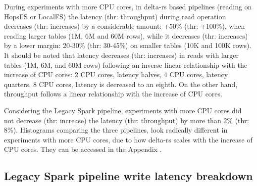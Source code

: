 During experiments with more \gls{CPU} cores, in delta-rs based pipelines (reading on \gls{HopsFS} or \gls{LocalFS}) the latency (thr: throughput) during read operation decreases (thr: increases) by a considerable amount: +50\% (thr: +100\%), when reading larger tables (1M, 6M and 60M rows), while it decreases (thr: increases) by a lower margin: 20-30\% (thr: 30-45\%) on smaller tables (10K and 100K rows). It should be noted that latency decreases (thr: increases) in reads with larger tables (1M, 6M, and 60M rows) following an inverse linear relationship with the increase of \gls{CPU} cores: 2 \gls{CPU} cores, latency halves, 4 \gls{CPU} cores, latency quarters, 8 \gls{CPU} cores, latency is decreased to an eighth. On the other hand, throughput follows a linear relationship with the increase of \gls{CPU} cores.

Considering the Legacy Spark pipeline, experiments with more \gls{CPU} cores did not decrease (thr: increase) the latency (thr: throughput) by more than 2\% (thr: 8\%). Histograms comparing the three pipelines, look radically different in experiments with more \gls{CPU} cores, due to how delta-rs scales with the increase of \gls{CPU} cores. They can be accessed in the Appendix .

\subsection{Legacy Spark pipeline write latency breakdown}

